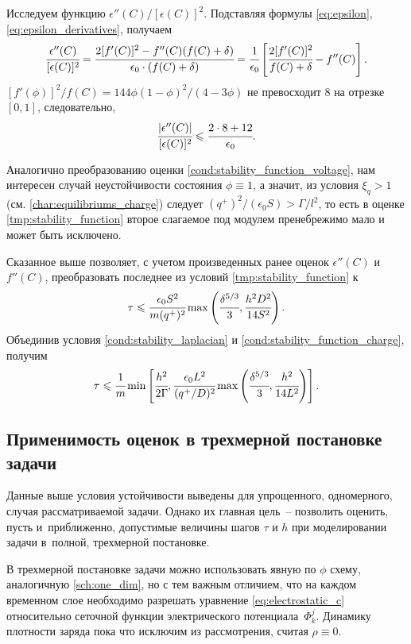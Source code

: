 Исследуем функцию $\epsilon''(C) / [\epsilon(C)]^2$. Подставляя формулы \eqref{eq:epsilon}, \eqref{eq:epsilon_derivatives}, получаем
\[
    \cfrac{\epsilon''(C)}{[\epsilon(C)]^2} = \cfrac{2 [f'(C)]^2 - f''(C)(f(C) + \delta)}{\epsilon_0 \cdot (f(C) + \delta)} = \cfrac{1}{\epsilon_0} \left[ \cfrac{2 [f'(C)]^2}{f(C) + \delta} - f''(C) \right].
\]
$[f'(\phi)]^2 / f(C) = 144 \phi (1 - \phi)^2 / (4 - 3 \phi)$ не превосходит $8$ на отрезке $[0, 1]$, следовательно,
\[
    \cfrac{|\epsilon''(C)|}{[\epsilon(C)]^2} \leqslant \cfrac{2 \cdot 8 + 12}{\epsilon_0}.
\]

Аналогично преобразованию оценки \eqref{cond:stability_function_voltage}, нам интересен случай неустойчивости состояния $\phi \equiv 1$, а значит, из условия $\xi_q > 1$ (см. \eqref{char:equilibriums_charge}) следует $(q^+)^2 / (\epsilon_0 S) > \Gamma / l^2$, то есть в оценке \eqref{tmp:stability_function} второе слагаемое под модулем пренебрежимо мало и может быть исключено.

Сказанное выше позволяет, с учетом произведенных ранее оценок $\epsilon''(C)$ и $f''(C)$, преобразовать последнее из условий \eqref{tmp:stability_function} к
\begin{equation}
    \tau \leqslant \cfrac{\epsilon_0 S^2}{m (q^+)^2} \max \left( \cfrac{\delta^{5/3}}{3}, \cfrac{h^2 D^2}{14 S^2} \right).
    \label{cond:stability_function_charge}
\end{equation}
Объединив условия \eqref{cond:stability_laplacian} и \eqref{cond:stability_function_charge}, получим
\begin{equation}
    \tau \leqslant \cfrac{1}{m} \min \left[ \cfrac{h^2}{2 \Gamma}, \cfrac{\epsilon_0 L^2}{(q^+/D)^2} \max \left( \cfrac{\delta^{5/3}}{3}, \cfrac{h^2}{14 L^2} \right) \right].
    \label{cond:stability_charge}
\end{equation}


\subsection{Применимость оценок в трехмерной постановке задачи}

Данные выше условия устойчивости выведены для упрощенного, одномерного, случая рассматриваемой задачи. Однако их главная цель~-- позволить оценить, пусть и~приближенно, допустимые величины шагов $\tau$ и $h$ при моделировании задачи в~полной, трехмерной постановке.

В трехмерной постановке задачи можно использовать явную по $\phi$ схему, аналогичную \eqref{sch:one_dim}, но с тем важным отличием, что на каждом временном слое необходимо разрешать уравнение \eqref{eq:electrostatic_c} относительно сеточной функции электрического потенциала~$\Phi^j_k$. Динамику плотности заряда пока что исключим из рассмотрения, считая $\rho \equiv 0$.

